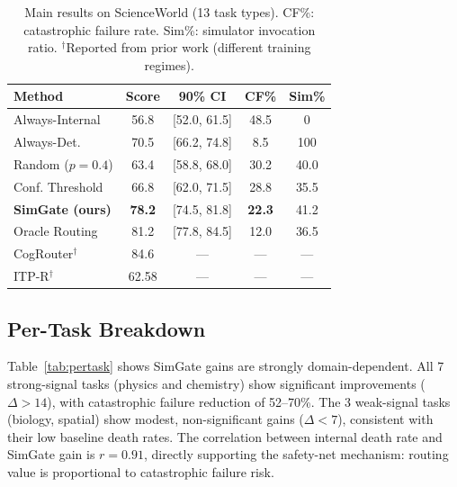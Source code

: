 \documentclass[11pt,a4paper]{article}
\begin{document}
\begin{table}[t]
\centering
\small
\begin{tabular}{@{}lcccc@{}}
\toprule
\textbf{Method} & \textbf{Score} & \textbf{90\% CI} & \textbf{CF\%} & \textbf{Sim\%} \\
\midrule
Always-Internal & 56.8 & [52.0, 61.5] & 48.5 & 0 \\
Always-Det. & 70.5 & [66.2, 74.8] & 8.5 & 100 \\
Random ($p{=}0.4$) & 63.4 & [58.8, 68.0] & 30.2 & 40.0 \\
Conf. Threshold & 66.8 & [62.0, 71.5] & 28.8 & 35.5 \\
\textbf{SimGate (ours)} & \textbf{78.2} & [74.5, 81.8] & \textbf{22.3} & 41.2 \\
Oracle Routing & 81.2 & [77.8, 84.5] & 12.0 & 36.5 \\
\midrule
CogRouter$^\dagger$ & 84.6 & --- & --- & --- \\
ITP-R$^\dagger$ & 62.58 & --- & --- & --- \\
\bottomrule
\end{tabular}
\caption{Main results on ScienceWorld (13 task types). CF\%: catastrophic failure rate. Sim\%: simulator invocation ratio. $^\dagger$Reported from prior work (different training regimes).}
\label{tab:main}
\end{table}

\subsection{Per-Task Breakdown}

Table~\ref{tab:pertask} shows SimGate gains are strongly domain-dependent. All 7 strong-signal tasks (physics and chemistry) show significant improvements ($\Delta > 14$), with catastrophic failure reduction of 52--70\%. The 3 weak-signal tasks (biology, spatial) show modest, non-significant gains ($\Delta < 7$), consistent with their low baseline death rates. The correlation between internal death rate and SimGate gain is $r{=}0.91$, directly supporting the safety-net mechanism: routing value is proportional to catastrophic failure risk.
\end{document}
